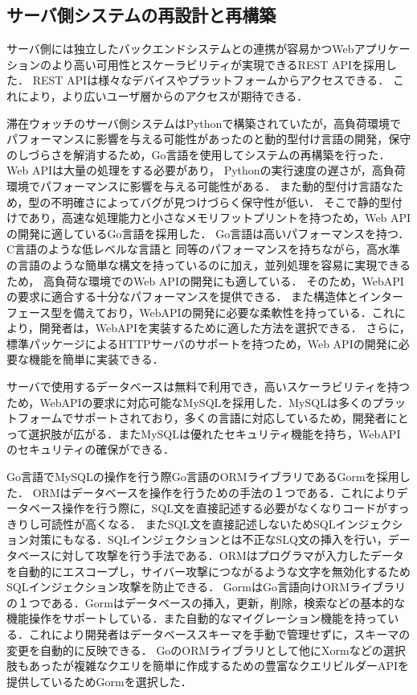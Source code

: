 



\subsection{サーバ側システムの再設計と再構築}\label{4.1.1}
サーバ側には独立したバックエンドシステムとの連携が容易かつWebアプリケーションのより高い可用性とスケーラビリティが実現できるREST APIを採用した．
REST APIは様々なデバイスやプラットフォームからアクセスできる．
これにより，より広いユーザ層からのアクセスが期待できる．


滞在ウォッチのサーバ側システムはPythonで構築されていたが，高負荷環境でパフォーマンスに影響を与える可能性があったのと動的型付け言語の開発，保守のしづらさを解消するため，Go言語を使用してシステムの再構築を行った．
Web APIは大量の処理をする必要があり，
Pythonの実行速度の遅さが，高負荷環境でパフォーマンスに影響を与える可能性がある．
また動的型付け言語なため，型の不明確さによってバグが見つけづらく保守性が低い．
そこで静的型付けであり，高速な処理能力と小さなメモリフットプリントを持つため，Web APIの開発に適しているGo言語を採用した．
Go言語は高いパフォーマンスを持つ．C言語のような低レベルな言語と
同等のパフォーマンスを持ちながら，高水準の言語のような簡単な構文を持っているのに加え，並列処理を容易に実現できるため，
高負荷な環境でのWeb APIの開発にも適している．
そのため，WebAPIの要求に適合する十分なパフォーマンスを提供できる．
また構造体とインターフェース型を備えており，WebAPIの開発に必要な柔軟性を持っている．これにより，開発者は，WebAPIを実装するために適した方法を選択できる．
さらに，標準パッケージによるHTTPサーバのサポートを持つため，Web APIの開発に必要な機能を簡単に実装できる．

サーバで使用するデータベースは無料で利用でき，高いスケーラビリティを持つため，WebAPIの要求に対応可能なMySQLを採用した．MySQLは多くのプラットフォームでサポートされており，多くの言語に対応しているため，開発者にとって選択肢が広がる．またMySQLは優れたセキュリティ機能を持ち，WebAPIのセキュリティの確保ができる．

Go言語でMySQLの操作を行う際Go言語のORMライブラリであるGormを採用した．
ORMはデータベースを操作を行うための手法の１つである．これによりデータベース操作を行う際に，SQL文を直接記述する必要がなくなりコードがすっきりし可読性が高くなる．
またSQL文を直接記述しないためSQLインジェクション対策にもなる．SQLインジェクションとは不正なSLQ文の挿入を行い，データベースに対して攻撃を行う手法である．ORMはプログラマが入力したデータを自動的にエスコープし，サイバー攻撃につながるような文字を無効化するためSQLインジェクション攻撃を防止できる．
GormはGo言語向けORMライブラリの１つである．Gormはデータベースの挿入，更新，削除，検索などの基本的な機能操作をサポートしている．また自動的なマイグレーション機能を持っている．これにより開発者はデータベーススキーマを手動で管理せずに，スキーマの変更を自動的に反映できる．
GoのORMライブラリとして他にXormなどの選択肢もあったが複雑なクエリを簡単に作成するための豊富なクエリビルダーAPIを提供しているためGormを選択した．


